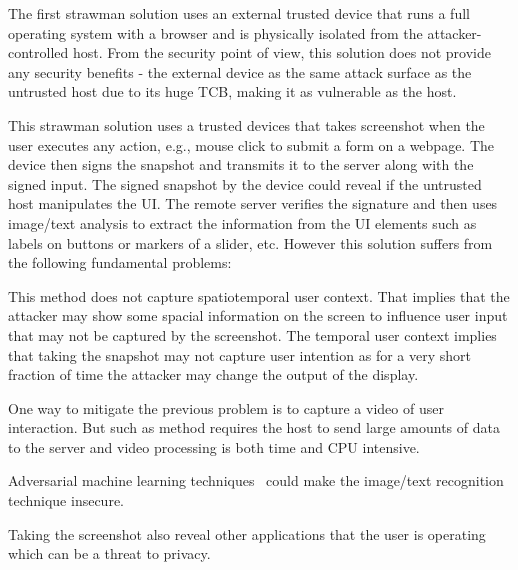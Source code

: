  The first strawman solution uses an external trusted device that runs a full operating system with a browser and is physically isolated from the attacker-controlled host. From the security point of view, this solution does not provide any security benefits - the external device as the same attack surface as the untrusted host due to its huge TCB, making it as vulnerable as the host.

 This strawman solution uses a trusted devices that takes screenshot when the user executes any action, e.g., mouse click to submit a form on a webpage. The device then signs the snapshot and transmits it to the server along with the signed input. The signed snapshot by the device could reveal if the untrusted host manipulates the UI. The remote server verifies the signature and then uses image/text analysis to extract the information from the UI elements such as labels on buttons or markers of a slider, etc. However this solution suffers from the following fundamental problems:
\begin{mylist}
  \item This method does not capture spatiotemporal user context. That implies that the attacker may show some spacial information on the screen to influence user input that may not be captured by the screenshot. The temporal user context implies that taking the snapshot may not capture user intention as for a very short fraction of time the attacker may change the output of the display.
  \item One way to mitigate the previous problem is to capture a video of user interaction. But such as method requires the host to send large amounts of data to the server and video processing is both time and CPU intensive. 
  \item Adversarial machine learning techniques~\cite{eykholt2017robust,sitawarin2018rogue} could make the image/text recognition technique insecure.
  \item Taking the screenshot also reveal other applications that the user is operating which can be a threat to privacy.
\end{mylist}


